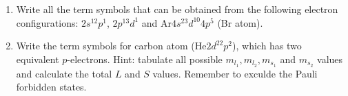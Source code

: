 \begin{enumerate}
\begin{enumerate}
\item Write all the term symbols that can be obtained from the following electron configurations: $2s^12p^1$, $2p^13d^1$ and Ar$4s^23d^{10}4p^5$ (Br atom).
\item Write the term symbols for carbon atom (He$2d^22p^2$), which has two equivalent $p$-electrons. Hint: tabulate all possible $m_{l_1}, m_{l_2}, m_{s_1}$ and $m_{s_2}$ values and calculate the total $L$ and $S$ values. Remember to exculde the Pauli forbidden states.
\end{enumerate}


\end{enumerate}
